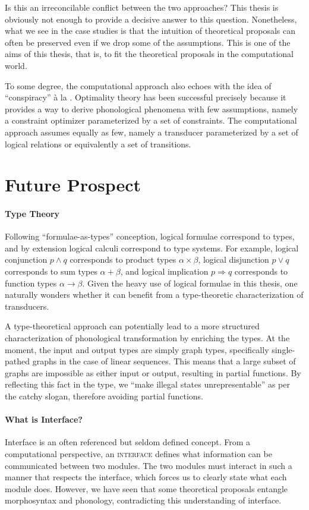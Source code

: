 \documentclass[12pt, a4paper]{report}
\newcommand{\textterm}[1]{\textsc{#1}\index{#1}}
\renewcommand{\implies}{\Rightarrow}
\begin{document}
Is this an irreconcilable conflict between the two approaches?  This
thesis is obviously not enough to provide a decisive answer to this
question.  Nonetheless, what we see in the case studies is that the
intuition of theoretical proposals can often be preserved even if we
drop some of the assumptions.  This is one of the aims of this thesis,
that is, to fit the theoretical proposals in the computational world.

To some degree, the computational approach also echoes with the idea
of \enquote{conspiracy} à la \textcite{k70fupr}.  Optimality theory
has been successful precisely because it provides a way to derive
phonological phenomena with few assumptions, namely a constraint
optimizer parameterized by a set of constraints.  The computational
approach assumes equally as few, namely a transducer parameterized by
a set of logical relations or equivalently a set of transitions.

\section{Future Prospect}
\paragraph{Type Theory}
Following  \enquote{formulae-as-types} conception,
logical formulae correspond to types, and by extension logical calculi
correspond to type systems.  For example, logical conjunction
\(p \land q\) corresponds to product types \(\alpha \times \beta\),
logical disjunction \(p \lor q\) corresponds to sum types
\(\alpha + \beta\), and logical implication \(p \implies q\)
corresponds to function types \(\alpha \to \beta\).  Given the heavy
use of logical formulae in this thesis, one naturally wonders whether
it can benefit from a type-theoretic characterization of transducers.

A type-theoretical approach can potentially lead to a more structured
characterization of phonological transformation by enriching the
types.  At the moment, the input and output types are simply graph
types, specifically single-pathed graphs in the case of linear
sequences.  This means that a large subset of graphs are impossible as
either input or output, resulting in partial functions.  By reflecting
this fact in the type, we \enquote{make illegal states
  unrepresentable} as per the catchy slogan, therefore avoiding
partial functions.

\paragraph{What is Interface?}
Interface is an often referenced but seldom defined concept.  From a
computational perspective, an \textterm{interface} defines what
information can be communicated between two modules.  The two modules
must interact in such a manner that respects the interface, which
forces us to clearly state what each module does.  However, we have
seen that some theoretical proposals entangle morphosyntax and
phonology, contradicting this understanding of interface.
\end{document}
